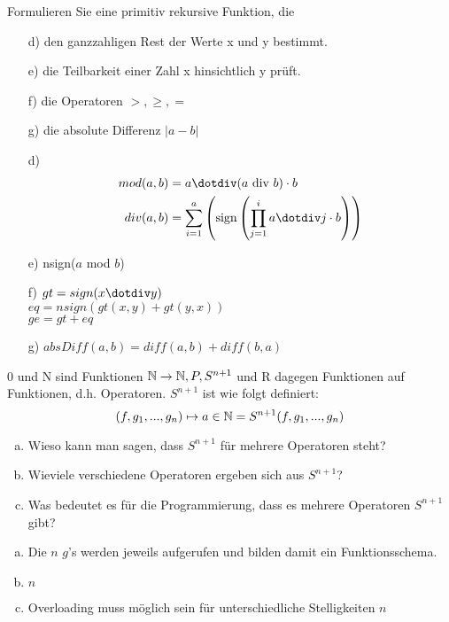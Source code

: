 \begin{card}
  Formulieren Sie eine primitiv rekursive Funktion, die
  \begin{enumerate}
    \item[d)] den ganzzahligen Rest der Werte x und y bestimmt.
    \item[e)] die Teilbarkeit einer Zahl x hinsichtlich y prüft.
    \item[f)] die Operatoren $>, \geq, =$
    \item[g)] die absolute Differenz $|a - b|$
	\end{enumerate}
	\hr
  \begin{enumerate}
    \item[d)]
      \begin{align*}
        mod(a, b) &= a \dotdiv (a \text{ div } b) \cdot b \\
        div(a, b) &= \sum\limits_{i=1}^a \lrk \text{sign} \lrk \prod\limits_{j=1}^i a \dotdiv j \cdot b \rrk \rrk
      \end{align*}
    \item[e)] nsign($a$ mod $b$)
    \item[f)] $gt = sign(x \dotdiv y)$ \\
              $eq = nsign(gt(x, y) + gt(y,x))$ \\
              $ge = gt + eq$
    \item[g)] $absDiff(a,b) = diff(a, b) + diff(b, a)$ \\
	\end{enumerate}
\end{card}

\begin{card}
  0 und N sind Funktionen $\mathbb{N} \rightarrow \mathbb{N}, P, S^{n+1}$ und R dagegen
  Funktionen auf Funktionen, d.h. Operatoren. $S^{n+1}$ ist wie folgt definiert:
  \[
    (f, g_1,..., g_n) \mapsto a \in \mathbb{N} = S^{n+1}(f, g_1,..., g_n)
  \]

  \begin{enumerate}[a)]
    \item Wieso kann man sagen, dass $S^{n+1}$ für mehrere Operatoren steht?
    \item Wieviele verschiedene Operatoren ergeben sich aus $S^{n+1}$?
    \item Was bedeutet es für die Programmierung, dass es mehrere Operatoren $S^{n+1} $ gibt?
  \end{enumerate}
  \hr
  \begin{enumerate}[a)]
    \item Die $n$ $g$'s werden jeweils aufgerufen und bilden damit ein Funktionsschema.
    \item $n$
    \item Overloading muss möglich sein für unterschiedliche Stelligkeiten $n$
  \end{enumerate}
\end{card}

